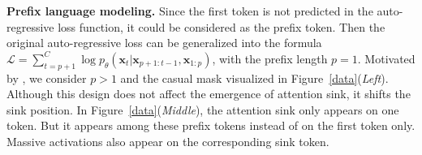 \textbf{Prefix language modeling.} Since the first token is not predicted in the auto-regressive loss function, it could be considered as the prefix token. Then the original auto-regressive loss can be generalized into the formula $\mathcal{L}=\sum_{t=p+1}^C\log p_{\theta}(\boldsymbol{x}_t|\boldsymbol{x}_{p+1:t-1}\textrm{,}\,\boldsymbol{x}_{1:p})$, with the prefix length $p=1$. Motivated by \citet{wang2022language}, we consider $p>1$ and the casual mask visualized in Figure~\ref{data}(\emph{Left}). Although this design does not affect the emergence of attention sink, it shifts the sink position. In Figure~\ref{data}(\emph{Middle}), the attention sink only appears on one token. But it appears among these prefix tokens instead of on the first token only. Massive activations also appear on the corresponding sink token.







